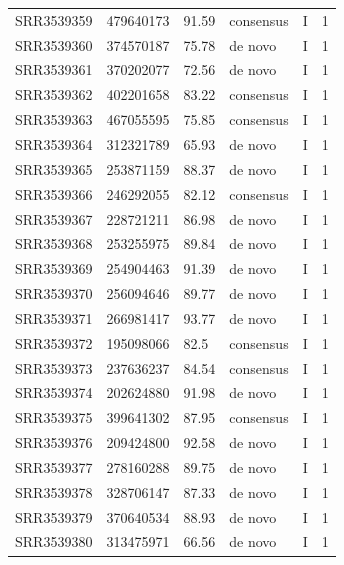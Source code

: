 \begin{longtable}{@{}llllll@{}}
SRR3539359 & 479640173     & 91.59       & consensus    & I        & 1        \\
SRR3539360 & 374570187     & 75.78       & de novo      & I        & 1        \\
SRR3539361 & 370202077     & 72.56       & de novo      & I        & 1        \\
SRR3539362 & 402201658     & 83.22       & consensus    & I        & 1        \\
SRR3539363 & 467055595     & 75.85       & consensus    & I        & 1        \\
SRR3539364 & 312321789     & 65.93       & de novo      & I        & 1        \\
SRR3539365 & 253871159     & 88.37       & de novo      & I        & 1        \\
SRR3539366 & 246292055     & 82.12       & consensus    & I        & 1        \\
SRR3539367 & 228721211     & 86.98       & de novo      & I        & 1        \\
SRR3539368 & 253255975     & 89.84       & de novo      & I        & 1        \\
SRR3539369 & 254904463     & 91.39       & de novo      & I        & 1        \\
SRR3539370 & 256094646     & 89.77       & de novo      & I        & 1        \\
SRR3539371 & 266981417     & 93.77       & de novo      & I        & 1        \\
SRR3539372 & 195098066     & 82.5        & consensus    & I        & 1        \\
SRR3539373 & 237636237     & 84.54       & consensus    & I        & 1        \\
SRR3539374 & 202624880     & 91.98       & de novo      & I        & 1        \\
SRR3539375 & 399641302     & 87.95       & consensus    & I        & 1        \\
SRR3539376 & 209424800     & 92.58       & de novo      & I        & 1        \\
SRR3539377 & 278160288     & 89.75       & de novo      & I        & 1        \\
SRR3539378 & 328706147     & 87.33       & de novo      & I        & 1        \\
SRR3539379 & 370640534     & 88.93       & de novo      & I        & 1        \\
SRR3539380 & 313475971     & 66.56       & de novo      & I        & 1        \\

\end{longtable}
